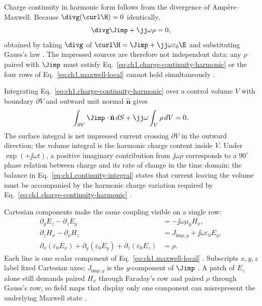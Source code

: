 Charge continuity in harmonic form follows from the divergence of Amp\`ere--Maxwell. Because $\divg(\curl\H)=0$ identically,
\begin{equation}
\label{eq:ch1.charge-continuity-harmonic}
\divg\Jimp+\jj\omega\rho=0,
\end{equation}
obtained by taking $\divg$ of $\curl\H=\Jimp+\jj\omega\varepsilon_0\E$ and substituting Gauss's law \cite{maxwell1873,stratton1941}. The impressed sources are therefore not independent data: any $\rho$ paired with $\Jimp$ must satisfy Eq.~\eqref{eq:ch1.charge-continuity-harmonic} or the four rows of Eq.~\eqref{eq:ch1.maxwell-local} cannot hold simultaneously \cite{hansen1988}.

Integrating Eq.~\eqref{eq:ch1.charge-continuity-harmonic} over a control volume $V$ with boundary $\partial V$ and outward unit normal $\hat{\mathbf{n}}$ gives
\begin{equation}
\label{eq:ch1.continuity-integral}
\int_{\partial V}\Jimp\cdot\hat{\mathbf{n}}\,dS
+\jj\omega\int_V\rho\,dV=0.
\end{equation}
The surface integral is net impressed current crossing $\partial V$ in the outward direction; the volume integral is the harmonic charge content inside $V$. Under $\exp(+\jj\omega t)$, a positive imaginary contribution from $\jj\omega\rho$ corresponds to a $90^\circ$ phase relation between charge and its rate of change in the time domain; the balance in Eq.~\eqref{eq:ch1.continuity-integral} states that current leaving the volume must be accompanied by the harmonic charge variation required by Eq.~\eqref{eq:ch1.charge-continuity-harmonic} \cite{maxwell1873,stratton1941}.

Cartesian components make the same coupling visible on a single row:
\begin{equation}
\label{eq:ch1.maxwell-component-example}
\begin{aligned}
\partial_y E_z-\partial_z E_y&=-\jj\omega\mu_0 H_x,\\
\partial_z H_x-\partial_x H_z&=J_{\mathrm{imp},y}+\jj\omega\varepsilon_0 E_y,\\
\partial_x(\varepsilon_0 E_x)+\partial_y(\varepsilon_0 E_y)+\partial_z(\varepsilon_0 E_z)&=\rho.
\end{aligned}
\end{equation}
Each line is one scalar component of Eq.~\eqref{eq:ch1.maxwell-local} \cite{stratton1941}. Subscripts $x,y,z$ label fixed Cartesian axes; $J_{\mathrm{imp},y}$ is the $y$-component of $\Jimp$ \cite{harrington2001}. A patch of $E_z$ alone still demands paired $H_x$ through Faraday's row and paired $\rho$ through Gauss's row, so field maps that display only one component can misrepresent the underlying Maxwell state \cite{maxwell1873}.

